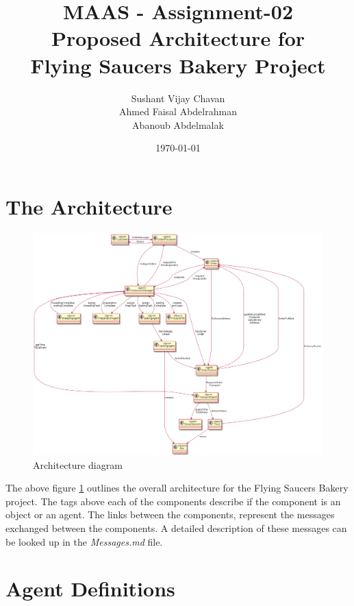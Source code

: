 \documentclass[11pt, a4paper]{article}
\title{MAAS - Assignment-02\\
Proposed Architecture for \\Flying Saucers Bakery Project}
\author{Sushant Vijay Chavan\\Ahmed Faisal Abdelrahman\\Abanoub Abdelmalak}
\date{\today}
\begin{document}
\maketitle
\newpage
\newpage

\section{The Architecture}
\begin{figure}[h!]
	\centering
	\includegraphics[angle=90, scale=0.385]{../Bakery.png}
	\caption{Architecture diagram}
	\label{Architecture diagram}
\end{figure}
The above figure \ref{Architecture diagram} outlines the overall architecture for the Flying Saucers Bakery project. The tags  above each of the components describe if the component is an object or an agent. The links between the components, represent the messages exchanged between the components. A detailed description of these messages can be looked up in the \textit{Messages.md} file.

\section{Agent Definitions}
\end{document}

